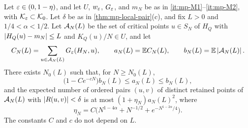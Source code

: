 \begin{corollary}\label{cor:mp-filter-upper}
Let $\varepsilon\in(0,1-\eta)$, and let $U$, $w_\varepsilon$, $G_\varepsilon$, and $m_N$ be as in \ref{it:mp-M1}--\ref{it:mp-M2}, with $\mathcal K_\varepsilon\subset\mathcal K_0$. Let $\delta$ be as in \cref{thm:mp-local-pair}(c), and fix $L>0$ and $1/4<\alpha<1/2$. Let $\mathcal A_N(L)$ be the set of critical points $u\in S_N$ of $H_Q$ with $\left|H_Q(u)-m_N\right|\le L$ and $K_Q(u)/N\in U$, and let
\[
C_N(L)=\sum_{u\in\mathcal A_N(L)}G_\varepsilon(H_N,u),\qquad a_N(L)=\mathbb E C_N(L),\qquad b_N(L)=\mathbb E\left|\mathcal A_N(L)\right|.
\]
There exists $N_0(L)$ such that, for $N\ge N_0(L)$,
\begin{equation}\label{eq:mp-mean-comparison}
\bigl(1-Ce^{-cN}\bigr)b_N(L)\le a_N(L)\le b_N(L),
\end{equation}
and the expected number of ordered pairs $(u,v)$ of distinct retained points of $\mathcal A_N(L)$ with $\left|R(u,v)\right|<\delta$ is at most $(1+\eta_N)a_N(L)^2$, where
\begin{equation}\label{eq:mp-etaN}
\eta_N=C\bigl(N^{1-4\alpha}+N^{-1/2}+e^{-N^{1-2\alpha}/4}\bigr).
\end{equation}
The constants $C$ and $c$ do not depend on $L$.
\end{corollary}

